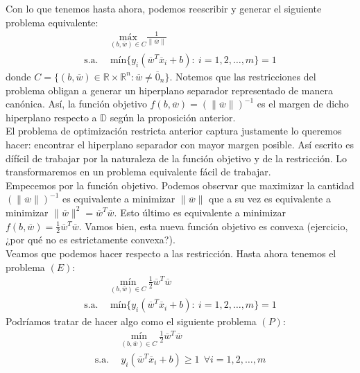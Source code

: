 \documentclass[11pt]{article}
\newcommand{\R}{\mathbb{R}}
\newcommand{\Rn}{\R^{n}}
\newcommand{\Rnu}{\R\times\Rn}
\newcommand{\wv}{\overline{w}}
\newcommand{\x}{\overline{x}}
\newcommand{\z}{\overline{0}_{n}}
\newcommand{\Sm}{1,2,\ldots, m}
\newcommand{\Dat}{\mathbb{D}}
\newcommand{\nw}{\|\wv\|}
\begin{document}
Con lo que tenemos hasta ahora, podemos reescribir y generar el siguiente problema equivalente:
\begin{equation*}
\begin{aligned}
& \underset{(b,\wv)\in C}{\text{máx}} \frac{1}{\nw} \\
\text{s.a.}\ \
& \text{mín}\{y_{i}(\wv^{T}\x_{i}+b):\ i=\Sm \}=1
\end{aligned}
\end{equation*}
donde $C=\{(b,\wv)\in\Rnu: \wv\ne\z\}$. Notemos que las restricciones del problema obligan a generar un hiperplano separador  representado de manera canónica. Así, la función objetivo $f(b, \wv)=(\nw)^{-1}$ es el margen de dicho hiperplano respecto a $\Dat$ según la proposición anterior.\\

El problema de optimización restricta anterior captura justamente lo queremos hacer: encontrar el hiperplano separador con mayor margen posible. Así escrito es dífícil de trabajar por la naturaleza de la función objetivo y de la restricción. Lo transformaremos en un problema equivalente fácil de trabajar.\\

Empecemos por la función objetivo. Podemos observar que maximizar la cantidad $(\nw)^{-1}$ es equivalente a minimizar $\nw$ que a su vez es equivalente a minimizar $\nw^{2}=\wv^{T}\wv$. Esto último es equivalente a minimizar $f(b, \wv)=\frac{1}{2}\wv^{T}\wv$. Vamos bien, esta nueva función objetivo es convexa (ejercicio, ¿por qué no es estrictamente convexa?).\\

Veamos que podemos hacer respecto a las restricción. Hasta ahora tenemos el problema $(E)$:
\begin{equation*}
\begin{aligned}
& \underset{(b,\wv)\in C}{\text{mín}}\ \frac{1}{2}\wv^{T}\wv \\
\text{s.a.}\ \
& \text{mín}\{y_{i}(\wv^{T}\x_{i}+b):\ i=\Sm \}=1
\end{aligned}
\end{equation*}
Podríamos tratar de hacer algo como el siguiente problema $(P)$:
\begin{equation*}
\begin{aligned}
& \underset{(b,\wv)\in C}{\text{mín}}\ \frac{1}{2}\wv^{T}\wv \\
\text{s.a.}\ \
& y_{i}(\wv^{T}\x_{i}+b)\geq1\ \ \forall i=\Sm
\end{aligned}
\end{equation*}
\end{document}
